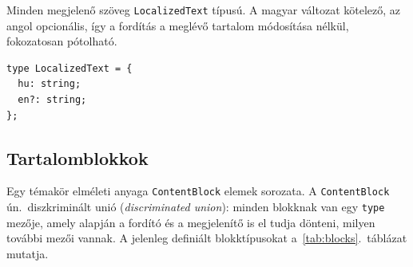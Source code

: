\documentclass[12pt,a4paper]{report}
\begin{document}
Minden megjelenő szöveg \texttt{LocalizedText} típusú. A magyar
változat kötelező, az angol opcionális, így a fordítás a meglévő
tartalom módosítása nélkül, fokozatosan pótolható.

\begin{lstlisting}
type LocalizedText = {
  hu: string;
  en?: string;
};
\end{lstlisting}

\subsection{Tartalomblokkok}

Egy témakör elméleti anyaga \texttt{ContentBlock} elemek sorozata.
A \texttt{ContentBlock} ún.\ diszkriminált unió (\emph{discriminated
union}): minden blokknak van egy \texttt{type} mezője, amely alapján a
fordító és a megjelenítő is el tudja dönteni, milyen további mezői
vannak. A jelenleg definiált blokktípusokat
a~\ref{tab:blocks}.~táblázat mutatja.
\end{document}
